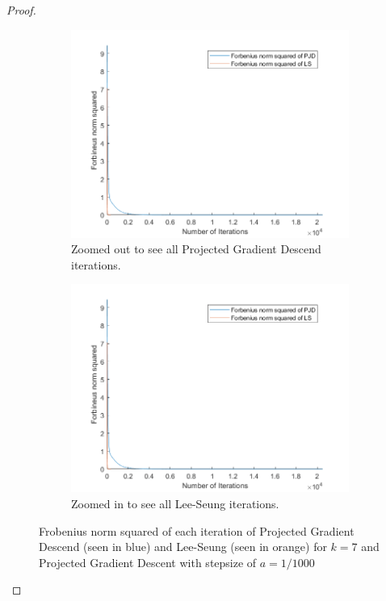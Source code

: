 \documentclass[12pt]{report}
\begin{document}
\begin{problem}
\begin{proof}
\begin{figure}[H]
    \begin{subfigure}[b]{0.5\linewidth}
        \centering
        \includegraphics[width=\linewidth]{images/k7la1000.png}
        \caption{Zoomed out to see all Projected Gradient Descend iterations.}
        \label{fig3:a}
        \vspace{4ex}
    \end{subfigure}%
    \begin{subfigure}[b]{0.5\linewidth}
        \centering
        \includegraphics[width=\linewidth]{images/k7la1000.png}
        \caption{Zoomed in to see all Lee-Seung iterations.}
        \label{fig3:b}
        \vspace{4ex}
    \end{subfigure}
    \caption{Frobenius norm squared of each iteration of Projected Gradient Descend (seen in blue) and Lee-Seung (seen in orange) for $k=7$ and Projected Gradient Descent with stepsize of $a=1/1000$}
    \label{fig3}
\end{figure}


\end{proof}
\end{problem}
\end{document}

